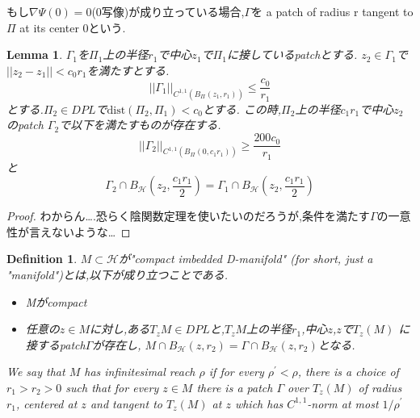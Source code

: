 \documentclass{jarticle}
\newtheorem{dfn}[thm]{Definition}
\newtheorem{lem}[thm]{Lemma}
\newcommand{\bh}[2]{B_{\mathcal{H}}(#1,#2)}
\newcommand{\bp}[3]{B_{\Pi_{#3}}(#1,#2)}
\newcommand{\gn}[4]{||\Gamma_{#1}||_{C^{1,1}(\bp{#2}{#3}{#4})}}
\newcommand{\gnaaad}{||\Gamma_1||_{C^{1,1}(\bp{z_1}{r_1}{})}}
\begin{document}
もし$ \nabla \Psi(0)=0$(0写像)が成り立っている場合,$\Gamma$を
a patch of radius r tangent to $\Pi$ at its center 0という.

\begin{lem}
  $\Gamma_1$を$\Pi_1$上の半径$r_1$で中心$z_1$で$\Pi_1$に接しているpatchとする.
  $z_2 \in \Gamma_1$で$||z_2 -z_1 || < c_0r_1$を満たすとする.
  \begin{equation*}
   \gnaaad \le \frac{c_0}{r_1}
  \end{equation*}
  とする.$\Pi_2 \in DPL$で$\mathrm{dist}(\Pi_2,\Pi_1) <c_0$とする.
  この時,$\Pi_2$上の半径$c_1r_1$で中心$z_2$のpatch $\Gamma_2$で以下を満たすものが存在する.
  \begin{equation*}
   \gn{2}{0}{c_1r_1}{} \ge \frac{200c_0}{r_1}
  \end{equation*}
と
\begin{equation*}
\Gamma_2 \cap \bh{z_2}{\frac{c_1r_1}{2}} = \Gamma_1 \cap \bh{z_2}{\frac{c_1r_1}{2}}
\end{equation*}
\end{lem}
\begin{proof}
 わからん….恐らく陰関数定理を使いたいのだろうが,条件を満たす$\Gamma$の一意性が言えないような…
\end{proof}

\begin{dfn}
  $M \subset \mathcal{H}$が"compact imbedded D-manifold" (for short, just a "manifold")とは,以下が成り立つことである.
\begin{itemize}
  \item Mがcompact
  \item 任意の$z \in M$に対し,ある$T_zM \in DPL$と,$T_zM$上の半径$r_1$,中心$z$,$z$で$T_z(M)$
  に接するpatch$\Gamma$が存在し,
  $M \cap B_{\mathcal{H}}(z,r_2)=\Gamma \cap B_{\mathcal{H}}(z,r_2)$となる.
\end{itemize}
We say that $M$ has infinitesimal reach $\rho$ if for every $\rho^{\prime} < \rho$, there is a choice of $r_1 > r_2 > 0$ such that
for every $z \in M$ there is a patch $\Gamma$ over $T_z(M)$ of radius $r_1$, centered at $z$ and tangent to $T_z(M)$ at $z$ which has $C^{1,1}$-norm at most $1/\rho^{\prime}$
\end{dfn}
\end{document}
